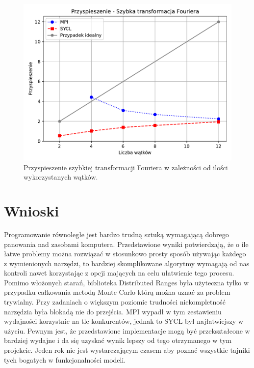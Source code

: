 \documentclass[a4paper,12pt]{book} %
\begin{document}
\begin{figure}
	\centering
	\includegraphics[scale=1]{assets/przyspieszenie_fft.pdf}
	\caption{Przyspieszenie szybkiej transformacji Fouriera w zależności od ilości wykorzystanych wątków.}
	\label{fig:fft-speedup}
\end{figure}

\section{Wnioski}
Programowanie równoległe jest bardzo trudną sztuką wymagającą dobrego panowania nad zasobami komputera. Przedstawione wyniki potwierdzają, że o ile łatwe problemy można rozwiązać w stosunkowo prosty sposób używając każdego z wymienionych narzędzi, to bardziej skomplikowane algorytmy wymagają od nas kontroli nawet korzystając z opcji mających na celu ułatwienie tego procesu. Pomimo włożonych starań, biblioteka Distributed Ranges była użyteczna tylko w przypadku całkowania metodą Monte Carlo którą można uznać za problem trywialny. Przy zadaniach o większym poziomie trudności niekompletność narzędzia była blokadą nie do przejścia. MPI wypadł w tym zestawieniu wydajności korzystnie na tle konkurentów, jednak to SYCL był najłatwiejszy w użyciu. Pewnym jest, że przedstawione implementacje mogą być przekształcone w bardziej wydajne i da się uzyskać wynik lepszy od tego otrzymanego w tym projekcie. Jeden rok nie jest wystarczającym czasem aby poznać wszystkie tajniki tych bogatych w funkcjonalności modeli. 
\end{document}
